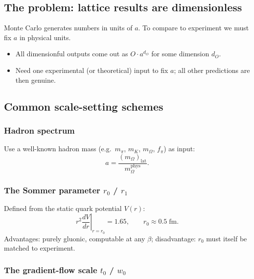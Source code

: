 \documentclass[11pt]{article}
\theoremstyle{definition}
\begin{document}
\subsection{The problem: lattice results are dimensionless}

Monte Carlo generates numbers in units of $a$.  To compare to experiment we must fix $a$ in physical units.

\begin{itemize}
    \item All dimensionful outputs come out as $O \cdot a^{d_O}$ for some dimension $d_O$.
    \item Need one experimental (or theoretical) input to fix $a$; all other predictions are then genuine.
\end{itemize}

\subsection{Common scale-setting schemes}

\subsubsection{Hadron spectrum}

Use a well-known hadron mass (e.g.\ $m_\pi$, $m_K$, $m_\Omega$, $f_\pi$) as input:
\begin{equation}
    a = \frac{(m_\Omega)_{\text{lat}}}{m_\Omega^{\text{phys}}}.
\end{equation}

\subsubsection{The Sommer parameter $r_0$ / $r_1$}

Defined from the static quark potential $V(r)$:
\begin{equation}
    \left. r^2 \frac{dV}{dr}\right|_{r=r_0} = 1.65, \qquad r_0 \approx 0.5\;\text{fm}.
\end{equation}
Advantages: purely gluonic, computable at any $\beta$; disadvantage: $r_0$ must itself be matched to experiment.

\subsubsection{The gradient-flow scale $t_0$ / $w_0$}
\end{document}
